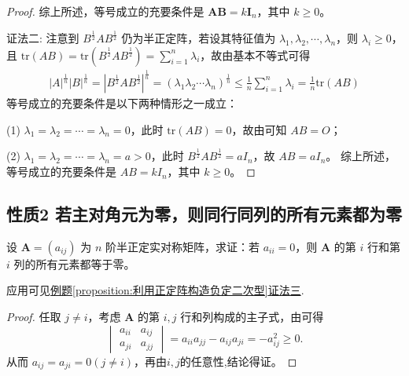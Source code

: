 \documentclass[../../main.tex]{subfiles}
\begin{document}
\begin{proof}
综上所述，等号成立的充要条件是 \(\boldsymbol{A}\boldsymbol{B}=k\boldsymbol{I}_n\)，其中 \(k\geqslant 0\)。

{\color{blue}证法二:}
注意到 \(B^{\frac{1}{2}}AB^{\frac{1}{2}}\) 仍为半正定阵，若设其特征值为 \(\lambda_1,\lambda_2,\cdots,\lambda_n\)，则 \(\lambda_i \geqslant  0\)，且 \(\mathrm{tr}(AB)=\mathrm{tr}(B^{\frac{1}{2}}AB^{\frac{1}{2}})=\sum_{i = 1}^{n}\lambda_i\)，故由基本不等式可得
\begin{align*}
|A|^{\frac{1}{n}}|B|^{\frac{1}{n}} = |B^{\frac{1}{2}}AB^{\frac{1}{2}}|^{\frac{1}{n}} = (\lambda_1\lambda_2\cdots\lambda_n)^{\frac{1}{n}} \leqslant  \frac{1}{n}\sum_{i = 1}^{n}\lambda_i = \frac{1}{n}\mathrm{tr}(AB)
\end{align*}
等号成立的充要条件是以下两种情形之一成立：

(1) \(\lambda_1 = \lambda_2 = \cdots = \lambda_n = 0\)，此时 \(\mathrm{tr}(AB) = 0\)，故由可知 \(AB = O\)；

(2) \(\lambda_1 = \lambda_2 = \cdots = \lambda_n = a > 0\)，此时 \(B^{\frac{1}{2}}AB^{\frac{1}{2}} = aI_n\)，故 \(AB = aI_n\)。
综上所述，等号成立的充要条件是 \(AB = kI_n\)，其中 \(k \geqslant  0\)。 
\end{proof}

\subsection{性质2 若主对角元为零，则同行同列的所有元素都为零}

\begin{proposition}\label{proposition:若主对角元为零，则同行同列的所有元素都为零}
设 \(\boldsymbol{A}=(a_{ij})\) 为 \(n\) 阶半正定实对称矩阵，求证：若 \(a_{ii}=0\)，则 \(\boldsymbol{A}\) 的第 \(i\) 行和第 \(i\) 列的所有元素都等于零。
\end{proposition}
\begin{remark}
应用可见\hyperref[proposition:利用正定阵构造负定二次型]{例题\ref{proposition:利用正定阵构造负定二次型}证法三}.
\end{remark}
\begin{proof}
任取 \(j\neq i\)，考虑 \(\boldsymbol{A}\) 的第 \(i,j\) 行和列构成的主子式，由可得
\[
\begin{vmatrix}
a_{ii}&a_{ij}\\
a_{ji}&a_{jj}
\end{vmatrix}=a_{ii}a_{jj}-a_{ij}a_{ji}=-a_{ij}^2\geqslant 0.
\]
从而 \(a_{ij}=a_{ji}=0(j\neq i)\)，再由$i,j$的任意性,结论得证。
\end{proof}
\end{document}
